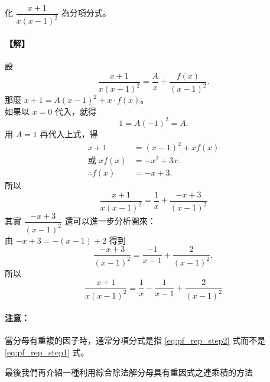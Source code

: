 \begin{example}\label{ex:7-3-7}
化 $\dfrac{x+1}{x(x-1)^2}$ 為分項分式。

\paragraph{【解】}
設
\begin{equation*}
  \frac{x+1}{x(x-1)^2} = \frac{A}{x} + \frac{f(x)}{(x-1)^2}.
\end{equation*}
那麼 $x+1 = A(x-1)^2 + x \cdot f(x)$。\\
如果以 $x=0$ 代入，就得
\begin{equation*}
  1 = A(-1)^2 = A.
\end{equation*}
用 $A=1$ 再代入上式，得
\begin{align*}
  x+1 &= (x-1)^2 + xf(x) \\
  \text{或 } xf(x) &= -x^2+3x. \\
  \therefore f(x) &= -x+3.
\end{align*}
所以
\begin{equation}
  \frac{x+1}{x(x-1)^2} = \frac{1}{x} + \frac{-x+3}{(x-1)^2} \label{eq:pf_rep_step1}
\end{equation}
其實 $\dfrac{-x+3}{(x-1)^2}$ 還可以進一步分析開來：\\
由 $-x+3 = -(x-1)+2$ 得到
\begin{equation*}
  \frac{-x+3}{(x-1)^2} = \frac{-1}{x-1} + \frac{2}{(x-1)^2},
\end{equation*}
所以
\begin{equation}
  \frac{x+1}{x(x-1)^2} = \frac{1}{x} - \frac{1}{x-1} + \frac{2}{(x-1)^2} \label{eq:pf_rep_step2}
\end{equation}
\end{example}

\paragraph{注意：}
當分母有重複的因子時，通常分項分式是指 \eqref{eq:pf_rep_step2} 式而不是 \eqref{eq:pf_rep_step1} 式。

最後我們再介紹一種利用綜合除法解分母具有重因式之連乘積的方法

